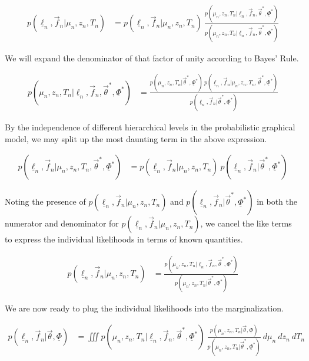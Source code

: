 \documentclass[12pt, onecolumn]{emulateapj}
\newcommand{\textul}{\underline}
\begin{document}
\begin{align}
p(\textul{\ell}_{n}, \vec{f}_{n} | \mu_{n}, z_{n}, T_{n}) &= p(\textul{\ell}_{n}, \vec{f}_{n} | \mu_{n}, z_{n}, T_{n})\ \frac{p(\mu_{n}, z_{n}, T_{n} | \textul{\ell}_{n}, \vec{f}_{n}, \vec{\theta}^{*}, \textul{\Phi}^{*})}{p(\mu_{n}, z_{n}, T_{n} | \textul{\ell}_{n}, \vec{f}_{n}, \vec{\theta}^{*}, \textul{\Phi}^{*})}
\end{align}

We will expand the denominator of that factor of unity according to Bayes' Rule.

\begin{align}
p(\mu_{n}, z_{n}, T_{n}|\textul{\ell}_{n}, \vec{f}_{n}, \vec{\theta}^{*}, \textul{\Phi}^{*}) &= \frac{p(\mu_{n}, z_{n}, T_{n} | \vec{\theta}^{*}, \textul{\Phi}^{*})\ p(\textul{\ell}_{n}, \vec{f}_{n} | \mu_{n}, z_{n}, T_{n}, \vec{\theta}^{*}, \textul{\Phi}^{*})}{p(\textul{\ell}_{n}, \vec{f}_{n} | \vec{\theta}^{*}, \textul{\Phi}^{*})}
\end{align}

By the independence of different hierarchical levels in the probabilistic graphical model, we may split up the most daunting term in the above expression.

\begin{align}
p(\textul{\ell}_{n}, \vec{f}_{n} | \mu_{n}, z_{n}, T_{n}, \vec{\theta}^{*}, \textul{\Phi}^{*}) &= p(\textul{\ell}_{n}, \vec{f}_{n} | \mu_{n}, z_{n}, T_{n})\ p(\textul{\ell}_{n}, \vec{f}_{n} | \vec{\theta}^{*}, \textul{\Phi}^{*})
\end{align}

Noting the presence of $p(\textul{\ell}_{n}, \vec{f}_{n} | \mu_{n}, z_{n}, T_{n})$ and $p(\textul{\ell}_{n}, \vec{f}_{n} | \vec{\theta}^{*}, \textul{\Phi}^{*})$ in both the numerator and denominator for $p(\textul{\ell}_{n}, \vec{f}_{n} | \mu_{n}, z_{n}, T_{n})$, we cancel the like terms to express the individual likelihoods in terms of known quantities.

\begin{align}
p(\textul{\ell}_{n}, \vec{f}_{n} | \mu_{n}, z_{n}, T_{n}) &= \frac{p(\mu_{n}, z_{n}, T_{n} | \textul{\ell}_{n}, \vec{f}_{n}, \vec{\theta}^{*}, \textul{\Phi}^{*})}{p(\mu_{n}, z_{n}, T_{n} | \vec{\theta}^{*}, \textul{\Phi}^{*})}
\end{align}

We are now ready to plug the individual likelihoods into the marginalization.

\begin{align}
p(\textul{\ell}_{n}, \vec{f}_{n} | \vec{\theta}, \textul{\Phi}) &= \iiint p(\mu_{n}, z_{n}, T_{n} | \textul{\ell}_{n}, \vec{f}_{n}, \vec{\theta}^{*}, \textul{\Phi}^{*})\ \frac{p(\mu_{n}, z_{n}, T_{n} | \vec{\theta}, \textul{\Phi})}{p(\mu_{n}, z_{n}, T_{n} | \vec{\theta}^{*}, \textul{\Phi}^{*})}\ d\mu_{n}\ dz_{n}\ dT_{n}
\end{align}
\end{document}
